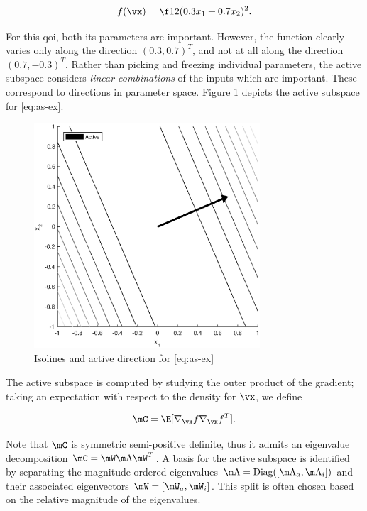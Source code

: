 \documentclass[../primer.tex]{subfiles}
\begin{document}
\begin{equation}\label{eq:as-ex}
  f(\vx) = \f12(0.3x_1+0.7x_2)^2.
\end{equation}

\noindent For this qoi, both its parameters are important. However, the function
clearly varies only along the direction $(0.3,0.7)^T$, and not at all along the
direction $(0.7,-0.3)^T$. Rather than picking and freezing individual
parameters, the active subspace considers \emph{linear combinations} of the
inputs which are important. These correspond to directions in parameter space.
Figure \ref{fig:as-ex} depicts the active subspace for \eqref{eq:as-ex}.

\begin{figure}[!ht]
  \centering
  \includegraphics[width=0.75\textwidth]{./images/contour_plot}
  \caption{Isolines and active direction for \eqref{eq:as-ex}}
  \label{fig:as-ex}
\end{figure}

The active subspace is computed by studying the outer product of the gradient;
taking an expectation with respect to the density for $\vx$, we define

\begin{equation}\label{eq:as-c}
  \mC = \E[\nabla_{\vx}f\nabla_{\vx}f^T].
\end{equation}

\noindent Note that $\mC$ is symmetric semi-positive definite, thus it admits an
eigenvalue decomposition $\mC=\mW\m\Lambda\mW^T$. A basis for the active
subspace is identified by separating the magnitude-ordered eigenvalues
$\m\Lambda=\text{Diag}([\m\Lambda_a,\m\Lambda_i])$ and their associated
eigenvectors $\mW=[\mW_a,\mW_i]$. This split is often chosen based on the
relative magnitude of the eigenvalues.
\end{document}
